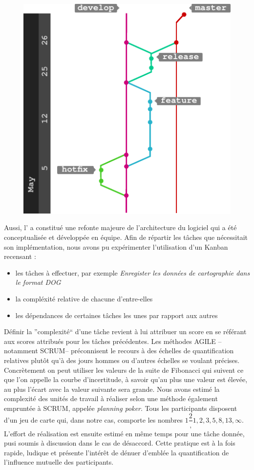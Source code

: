  \begin{figure}
    \centering
      \includegraphics[width=.7\linewidth]{figures/gitflow}  
    \label{fig:gitflow}
  \end{figure}
  
  Aussi, l' a constitué une refonte majeure de l'architecture du logiciel qui a été conceptualisée et développée en équipe. 
  Afin de répartir les tâches que nécessitait son implémentation, nous avons pu expérimenter l'utilisation d'un \gls{Kanban} recensant : 
  
  \begin{itemize}
   \item les tâches à effectuer, par exemple \emph{Enregister les données de cartographie dans le format DOG}
   \item la compléxité relative de chacune d'entre-elles 
   \item les dépendances de certaines tâches les unes par rapport aux autres
  \end{itemize}

  Définir la ''complexité`` d'une tâche revient à lui attribuer un score en se référant aux scores attribués pour les tâches précédentes. 
  Les méthodes AGILE --notamment SCRUM-- préconnisent le recours à des échelles de quantification relatives plutôt qu'à des jours hommes ou d'autres échelles se voulant précises. 
  Concrètement on peut utiliser les valeurs de la suite de Fibonacci qui suivent ce que l'on appelle la courbe d'incertitude, à savoir qu'au plus une valeur est élevée, au plus l'écart avec la valeur suivante sera grande. 
  Nous avons estimé la complexité des unités de travail à réaliser selon une méthode également empruntée à SCRUM, appelée \emph{planning poker}. 
  Tous les participants disposent d'un jeu de carte qui, dans notre cas, comporte les nombres $1\dfrac{2}, 1, 2, 3, 5, 8, 13, \infty$. 
  L'effort de réalisation est ensuite estimé en même temps pour une tâche donnée, pusi soumis à discussion dans le cas de désaccord. 
  Cette pratique est à la fois rapide, ludique et présente l'intérêt de dénuer d'emblée la quantification de l'influence mutuelle des participants. 
  

